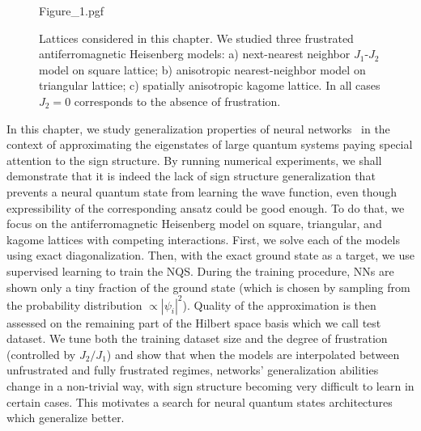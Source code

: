 \begin{figure}[h]
    \centering
    {Figure_1.pgf}
    \caption{Lattices considered in this chapter. We studied three frustrated antiferromagnetic Heisenberg models: a) next-nearest neighbor $J_1$-$J_2$ model on square lattice; b) anisotropic nearest-neighbor model on triangular lattice; c) spatially anisotropic kagome lattice. In all cases $J_2=0$ corresponds to the absence of frustration.}
    \label{fig:nc20:models}
\end{figure}

In this chapter, we study generalization properties of neural networks~\cite{Hinton93keepingneural,dziugaite2017computing} in the context of approximating the eigenstates of large quantum systems paying special attention to the sign structure. By running numerical experiments, we shall demonstrate that it is indeed the lack of sign structure generalization that prevents a neural quantum state from learning the wave function, even though expressibility of the corresponding ansatz could be good enough. To do that, we focus on the antiferromagnetic Heisenberg model on square, triangular, and kagome lattices with competing interactions. First, we solve each of the models using exact diagonalization. Then, with the exact ground state as a target, we use supervised learning to train the NQS. During the training procedure, NNs are shown only a tiny fraction of the ground state (which is chosen by sampling from the probability distribution $\propto |\psi_i|^2$). Quality of the approximation is then assessed on the remaining part of the Hilbert space basis which we call test dataset. We tune both the training dataset size and the degree of frustration (controlled by $J_2/J_1$) and show that when the models are interpolated between unfrustrated and fully frustrated regimes, networks' generalization abilities change in a non-trivial way, with sign structure becoming very difficult to learn in certain cases. This motivates a search for neural quantum states architectures which generalize better.

